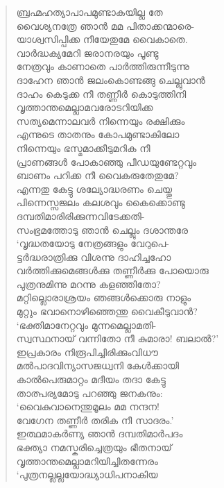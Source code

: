 \begin{verse}
ബ്രഹ്മഹത്യാപാപമുണ്ടാകയില്ല തേ\\
വൈശ്യനത്രേ ഞാന്‍ മമ പിതാക്കന്മാരെ-\\
യാശ്വസിപ്പിക്ക നീയേതുമേ വൈകാതെ.\\
വാര്‍ദ്ധക്യമേറി ജരാനരയും പൂണ്ടു\\
നേത്രവും കാണാതെ പാര്‍ത്തിരുന്നീടുന്നു\\
ദാഹേന ഞാന്‍ ജലംകൊണ്ടങ്ങു ചെല്ലുവാന്‍\\
ദാഹം കെടുക്ക നീ തണ്ണീര്‍ കൊടുത്തിനി\\
വൃത്താന്തമെല്ലാമവരോടറിയിക്ക\\
സത്യമെന്നാലവര്‍ നിന്നെയും രക്ഷിക്കും\\
എന്നുടെ താതനും കോപമുണ്ടാകിലോ\\
നിന്നെയും ഭസ്മമാക്കീടുമറിക നീ\\
പ്രാണങ്ങള്‍ പോകാഞ്ഞു പീഡയുണ്ടേറ്റവും\\
ബാണം പറിക്ക നീ വൈകരുതേതുമേ?\\
എന്നതു കേട്ടു ശല്യോദ്ധരണം ചെയ്തു\\
പിന്നെസ്സജലം കലശവും കൈക്കൊണ്ടു\\
ദമ്പതിമാരിരിക്കുന്നവിടേക്കതി-\\
സംഭ്രമത്തോടു ഞാന്‍ ചെല്ലും ദശാന്തരേ\\
‘വൃദ്ധതയോടു നേത്രങ്ങളും വേറുപെ-\\
ട്ടര്‍ദ്ധരാത്രിക്കു വിശന്നു ദാഹിച്ചഹോ\\
വര്‍ത്തിക്കുമെങ്ങള്‍ക്കു തണ്ണീര്‍ക്കു പോയൊരു\\
പുത്രനുമിന്നു  മറന്നു കളഞ്ഞിതോ?\\
മറ്റില്ലൊരാശ്രയം ഞങ്ങള്‍ക്കൊരു നാളും\\
മുറ്റും ഭവാനൊഴിഞ്ഞെന്തു വൈകീടുവാന്‍?\\
‘ഭക്തിമാനേറ്റവും മുന്നമെല്ലാമതി-\\
സ്വസ്ഥനായ് വന്നിതോ നീ കുമാരാ! ബലാല്‍?’\\
ഇപ്രകാരം നിരൂപിച്ചിരിക്കുംവിധൗ\\
മല്‍പാദവിന്യാസജധ്വനി കേള്‍ക്കായി\\
കാല്‍പെരുമാറ്റം മദീയം തദാ കേട്ടു\\
താത്പര്യമോടു പറഞ്ഞു ജനകനും:\\
‘വൈകുവാനെന്തുമൂലം മമ നന്ദന!\\
വേഗേന തണ്ണീര്‍ തരിക നീ സാദരം.’\\
ഇത്ഥമാകര്‍ണ്യ ഞാന്‍ ദമ്പതിമാര്‍പദം\\
ഭക്ത്യാ നമസ്കരിച്ചെത്രയും ഭീതനായ്\\
വൃത്താന്തമെല്ലാമറിയിച്ചിതന്നേരം\\
‘പുത്രനല്ലല്ലയോദ്ധ്യാധിപനാകിയ\\

\end{verse}

